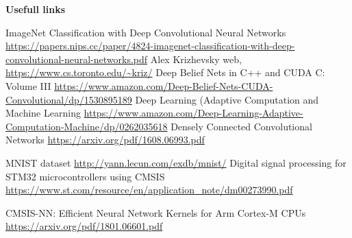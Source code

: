 \documentclass[xcolor=dvipsnames]{beamer}
\begin{document}
\begin{frame}{\bf Usefull links}

{\tiny
  \begin{thebibliography}{9}
    \bibitem {}ImageNet Classification with Deep Convolutional Neural Networks \url{https://papers.nips.cc/paper/4824-imagenet-classification-with-deep-convolutional-neural-networks.pdf}
    \bibitem {}Alex Krizhevsky web, \url{https://www.cs.toronto.edu/~kriz/}
    \bibitem {}Deep Belief Nets in C++ and CUDA C: Volume III \url{https://www.amazon.com/Deep-Belief-Nets-CUDA-Convolutional/dp/1530895189}
    \bibitem {}Deep Learning (Adaptive Computation and Machine Learning \url{https://www.amazon.com/Deep-Learning-Adaptive-Computation-Machine/dp/0262035618}
    \bibitem {}Densely Connected Convolutional Networks \url{https://arxiv.org/pdf/1608.06993.pdf}

    \bibitem {}MNIST dataset \url{http://yann.lecun.com/exdb/mnist/}
    \bibitem {}Digital signal processing for STM32 microcontrollers using CMSIS \url{https://www.st.com/resource/en/application_note/dm00273990.pdf}

    \bibitem {}CMSIS-NN: Efficient Neural Network Kernels for Arm Cortex-M CPUs \url{https://arxiv.org/pdf/1801.06601.pdf}

  \end{thebibliography}
}

\end{frame}
\end{document}
